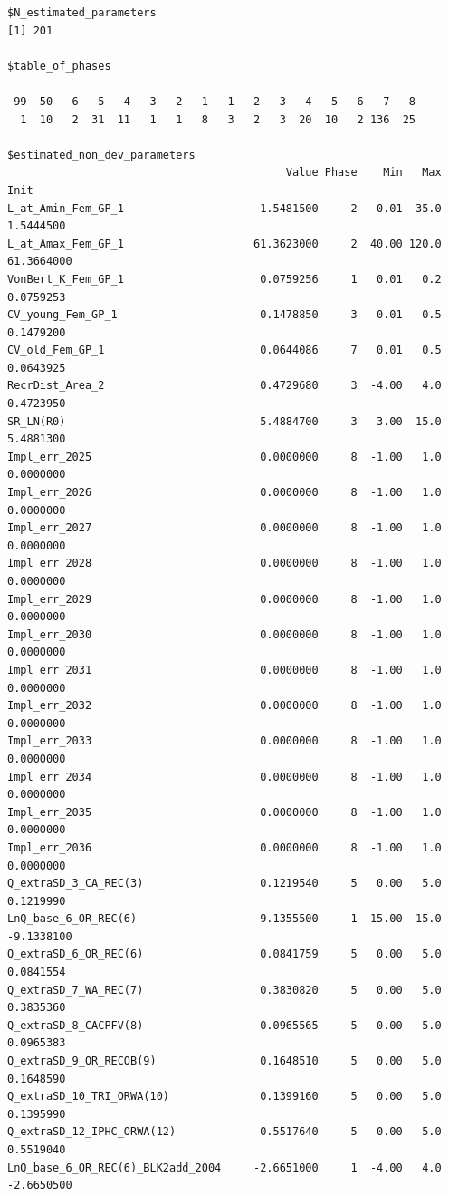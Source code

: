 \documentclass[
]{scrartcl}
\begin{document}
\begin{verbatim}
$N_estimated_parameters
[1] 201

$table_of_phases

-99 -50  -6  -5  -4  -3  -2  -1   1   2   3   4   5   6   7   8 
  1  10   2  31  11   1   1   8   3   2   3  20  10   2 136  25 

$estimated_non_dev_parameters
                                           Value Phase    Min   Max       Init
L_at_Amin_Fem_GP_1                     1.5481500     2   0.01  35.0  1.5444500
L_at_Amax_Fem_GP_1                    61.3623000     2  40.00 120.0 61.3664000
VonBert_K_Fem_GP_1                     0.0759256     1   0.01   0.2  0.0759253
CV_young_Fem_GP_1                      0.1478850     3   0.01   0.5  0.1479200
CV_old_Fem_GP_1                        0.0644086     7   0.01   0.5  0.0643925
RecrDist_Area_2                        0.4729680     3  -4.00   4.0  0.4723950
SR_LN(R0)                              5.4884700     3   3.00  15.0  5.4881300
Impl_err_2025                          0.0000000     8  -1.00   1.0  0.0000000
Impl_err_2026                          0.0000000     8  -1.00   1.0  0.0000000
Impl_err_2027                          0.0000000     8  -1.00   1.0  0.0000000
Impl_err_2028                          0.0000000     8  -1.00   1.0  0.0000000
Impl_err_2029                          0.0000000     8  -1.00   1.0  0.0000000
Impl_err_2030                          0.0000000     8  -1.00   1.0  0.0000000
Impl_err_2031                          0.0000000     8  -1.00   1.0  0.0000000
Impl_err_2032                          0.0000000     8  -1.00   1.0  0.0000000
Impl_err_2033                          0.0000000     8  -1.00   1.0  0.0000000
Impl_err_2034                          0.0000000     8  -1.00   1.0  0.0000000
Impl_err_2035                          0.0000000     8  -1.00   1.0  0.0000000
Impl_err_2036                          0.0000000     8  -1.00   1.0  0.0000000
Q_extraSD_3_CA_REC(3)                  0.1219540     5   0.00   5.0  0.1219990
LnQ_base_6_OR_REC(6)                  -9.1355500     1 -15.00  15.0 -9.1338100
Q_extraSD_6_OR_REC(6)                  0.0841759     5   0.00   5.0  0.0841554
Q_extraSD_7_WA_REC(7)                  0.3830820     5   0.00   5.0  0.3835360
Q_extraSD_8_CACPFV(8)                  0.0965565     5   0.00   5.0  0.0965383
Q_extraSD_9_OR_RECOB(9)                0.1648510     5   0.00   5.0  0.1648590
Q_extraSD_10_TRI_ORWA(10)              0.1399160     5   0.00   5.0  0.1395990
Q_extraSD_12_IPHC_ORWA(12)             0.5517640     5   0.00   5.0  0.5519040
LnQ_base_6_OR_REC(6)_BLK2add_2004     -2.6651000     1  -4.00   4.0 -2.6650500

\end{verbatim}
\end{document}

